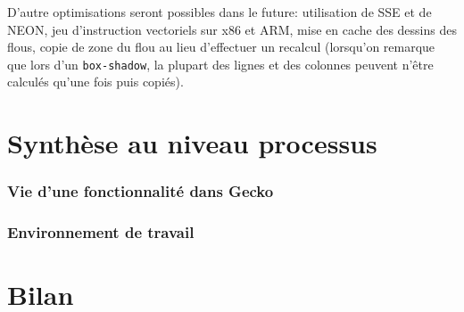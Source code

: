 \documentclass[a4paper,10pt]{article}
\newcommand{\cc}[1]{\texttt{#1}}
\begin{document}
\begin{multicols}{2}
  D'autre optimisations seront possibles dans le future: utilisation de SSE et
  de NEON, jeu d'instruction vectoriels sur x86 et ARM, mise en cache des
  dessins des flous, copie de zone du flou au lieu d'effectuer un recalcul
  (lorsqu'on remarque que lors d'un \cc{box-shadow}, la plupart des lignes et
  des colonnes peuvent n'être calculés qu'une fois puis copiés).

  \part{Synthèse au niveau processus}
  \section{Vie d'une fonctionnalité dans Gecko}
  \section{Environnement de travail}
  \part{Bilan}




\end{multicols}
\end{document}

